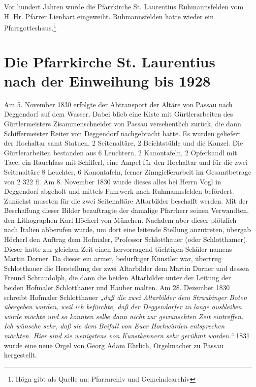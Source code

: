 \documentclass[12pt,a4paper]{book}
\begin{document}
Vor hundert Jahren wurde die Pfarrkirche St. Laurentius Ruhmannsfelden vom H.
Hr. Pfarrer Lienhart eingeweiht. Ruhmannsfelden hatte wieder ein
Pfarrgotteshaus.\footnote{Högn gibt als Quelle an: Pfarrarchiv und
Gemeindearchiv}

\section[nach der Einweihung bis 1928]{Die Pfarrkirche St. Laurentius nach der
Einweihung bis 1928\protect\footnotemark{}\protect{}}

Am 5. November 1830 erfolgte der Abtransport der Altäre von Passau nach
Deggendorf auf dem Wasser. Dabei blieb eine Kiste mit Gürtlerarbeiten des
Gürtlermeisters Zisammenschneider von Passau versehentlich zurück, die dann
Schiffermeister Reiter von Deggendorf nachgebracht hatte. Es wurden geliefert
der Hochaltar samt Statuen, 2 Seitenaltäre, 2 Beichtstühle und die Kanzel. Die
Gürtlerarbeiten bestanden aus 6 Leuchtern, 2 Kanontafeln, 2 Opferkandl mit Tace,
ein Rauchfass mit Schifferl, eine Ampel für den Hochaltar und für die zwei
Seitenaltäre 8 Leuchter, 6 Kanontafeln, ferner Zinngießerarbeit im Gesamtbetrage
von 2 322 fl. Am 8. November 1830 wurde dieses alles bei Herrn Vogl in
Deggendorf abgeholt und mittels Fuhrwerk nach Ruhmannsfelden befördert. Zunächst
mussten für die zwei Seitenaltäre Altarbilder beschafft werden. Mit der
Beschaffung dieser Bilder beauftragte der damalige Pfarrherr seinen Verwandten,
den Lithographen Karl Höcherl von München. Nachdem aber dieser plötzlich nach
Italien abberufen wurde, um dort eine leitende Stellung anzutreten, übergab
Höcherl den Auftrag dem Hofmaler, Professor Schlotthauer (oder Schlotthamer).
Dieser hatte zur gleichen Zeit einen hervorragend tüchtigen Schüler namens
Martin Dorner. Da dieser ein armer, bedürftiger Künstler war, übertrug
Schlotthauer die Herstellung der zwei Altarbilder dem Martin Dorner und dessen
Freund Schraudolph, die dann die beiden Altarbilder unter der Leitung der beiden
Hofmaler Schlotthauer und Hauber malten. Am 28. Dezember 1830 schreibt Hofmaler
Schlotthauer \emph{„daß die zwei Altarbilder dem Straubinger Boten übergeben
wurden, weil ich befürchte, daß der Deggendorfer zu lange ausbleiben würde
möchte und so könnten selbe dann nicht zur gewünschten Zeit eintreffen. Ich
wünsche sehr, daß sie dem Beifall von Euer Hochwürden entsprechen möchten. Hier
sind sie wenigstens von Kunstkennern sehr gerühmt worden.“} 1831 wurde eine neue
Orgel von Georg Adam Ehrlich, Orgelmacher zu Passau hergestellt.
\end{document}
